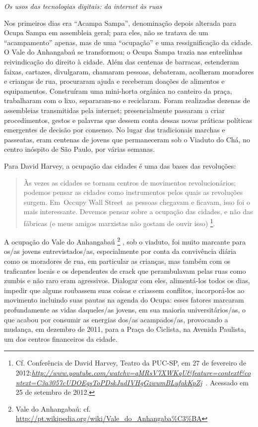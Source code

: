 \emph{Os usos das tecnologias digitais: da internet às ruas }

Nos primeiros dias era ``Acampa Sampa'', denominação depois alterada
para Ocupa Sampa em assembleia geral; para eles, não se tratava de um
``acampamento'' apenas, mas de uma ``ocupação'' e uma ressignificação da
cidade. O Vale do Anhangabaú se transformou; o Ocupa Sampa trazia nas
entrelinhas reivindicação do direito à cidade. Além das centenas de
barracas, estenderam faixas, cartazes, divulgaram, chamaram pessoas,
debateram, acolheram moradores e crianças de rua, procuraram ajuda e
receberam doações de alimentos e equipamentos. Construíram uma
mini-horta orgânica no canteiro da praça, trabalharam com o lixo,
separaram-no e reciclaram. Foram realizadas dezenas de assembleias
transmitidas pela internet; presencialmente passaram a criar
procedimentos, gestos e palavras que dessem conta dessas novas práticas
políticas emergentes de decisão por consenso. No lugar das tradicionais
marchas e passeatas, eram centenas de jovens que permaneceram sob o
Viaduto do Chá, no centro inóspito de São Paulo, por várias semanas.

Para David Harvey, a ocupação das cidades é uma das bases das
revoluções:

\begin{quote}
Às vezes as cidades se tornam centros de movimentos revolucionários;
podemos pensar as cidades como instrumentos pelos quais as revoluções
surgem. Em~Occupy Wall Street~as pessoas chegavam e ficavam, isso foi o
mais interessante. Devemos pensar sobre a ocupação das cidades, e não
das fábricas (e meus amigos marxistas não gostam de ouvir isso)
\footnote{Cf. Conferência de David Harvey, Teatro da PUC-SP, em 27 de
  fevereiro de
  2012:\href{http://www.youtube.com/watch?v=qMRsV7XWKqU\&feature=context\&context=C3a3057cUDOEgsToPDskJudIVHgGzwumBLufakKpZj}{\emph{http://www.youtube.com/watchv=qMRsV7XWKqU\&feature=context\&context=C3a3057cUDOEgsToPDskJudIVHgGzwumBLufakKpZj}}~.
  Acessado em 25 de setembro de 2012.}.
\end{quote}

A ocupação do Vale do Anhangabaú \footnote{Vale do Anhangabaú: cf.
  \url{http://pt.wikipedia.org/wiki/Vale_do_Anhangaba\%C3\%BA}} , sob o
viaduto, foi muito marcante para os/as jovens entrevistados/as,
especialmente por conta da convivência diária como os moradores de rua,
em particular as crianças, mas também com os traficantes locais e os
dependentes de crack que perambulavam pelas ruas como zumbis e não raro
eram agressivos. Dialogar com eles, alimentá-los todos os dias, impedir
que alguns roubassem suas coisas e criassem conflitos, incorporá-los ao
movimento incluindo suas pautas na agenda do Ocupa: esses fatores
marcaram profundamente as vidas daqueles/as jovens, em sua maioria
universitários/as, o que acabou por consumir as energias dos/as
acampados/as, provocando a mudança, em dezembro de 2011, para a Praça do
Ciclista, na Avenida Paulista, um dos centros financeiros da cidade.

